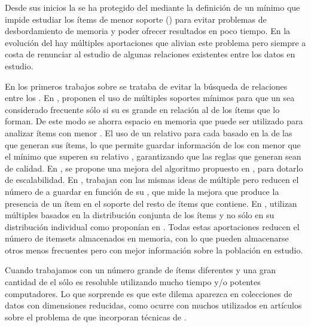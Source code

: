 Desde sus inicios la \ARM se ha protegido del \dilemaIR mediante la definición de un \soporte mínimo que impide estudiar los ítems de menor soporte (\irs) para evitar problemas de desbordamiento de memoria y poder ofrecer resultados en poco tiempo. En la evolución del \ARM hay múltiples aportaciones que alivian este problema pero siempre a costa de renunciar al estudio de algunas relaciones existentes entre los datos en estudio.

En los primeros trabajos sobre \ARM se trataba de evitar la búsqueda de relaciones entre los \irs \citep{AgrawalImielinskiSwami-MiningAssociationRulesBetweenSetsOfItemsInLargeDB-1993,AgrawalSrikant-FastAlgorithmsForMiningAssociationRules-1994,ParkChenYu-UsingAHashBasedMethod-1997}. En \cite{LiuHsuMa-ARMWithMultipleMS-1999}, proponen el uso de múltiples soportes mínimos para que un \itemset sea considerado frecuente sólo si su \soporte es grande en relación al \soporte de los ítems que lo forman. De este modo se ahorra espacio en memoria que puede ser utilizado para analizar ítems con menor \soporte. El uso de un \soporte relativo para cada \itemset basado en la \confianza de las \ars que generan sus ítems, lo que permite guardar información de los \itemsets con menor \soporte que el \soporte mínimo que superen su \soporte relativo \citep{YunHaHwangRyu-MiningAROnSignificantRareDataUsingRelativeSupport-2003}, garantizando que las reglas que generan sean de calidad. En \cite{HuChen-MiningARwithMMS-2006}, se propone una mejora del algoritmo propuesto en \cite{LiuHsuMa-ARMWithMultipleMS-1999}, para dotarlo de escalabilidad. En \cite{TsengLin-EfficientMiningOfAR-2007}, trabajan con las mismas ideas de \soporte múltiple pero reducen el número de \itemsets a guardar en función de su \lift, que mide la mejora que produce la presencia de un ítem en el soporte del resto de ítems que contiene. En \cite{KiranReddy-ImprovedMultipleMSBasedAppMineRareAR-2009}, utilizan múltiples \soportes basados en la distribución conjunta de los ítems y no sólo en su distribución individual como proponían en \cite{LiuHsuMa-ARMWithMultipleMS-1999}. Todas estas aportaciones reducen el número de itemsets almacenados en memoria, con lo que pueden almacenarse otros \itemsets menos frecuentes pero con mejor información sobre la población en estudio.

Cuando trabajamos con un número grande de ítems diferentes y una gran cantidad de \transacciones el \dilemaIR sólo es resoluble utilizando mucho tiempo y/o potentes computadores. Lo que sorprende es que este dilema aparezca en colecciones de datos con dimensiones reducidas, como ocurre con muchos \datasets utilizados en artículos sobre el problema de \Clasificacion que incorporan técnicas de \arm.

